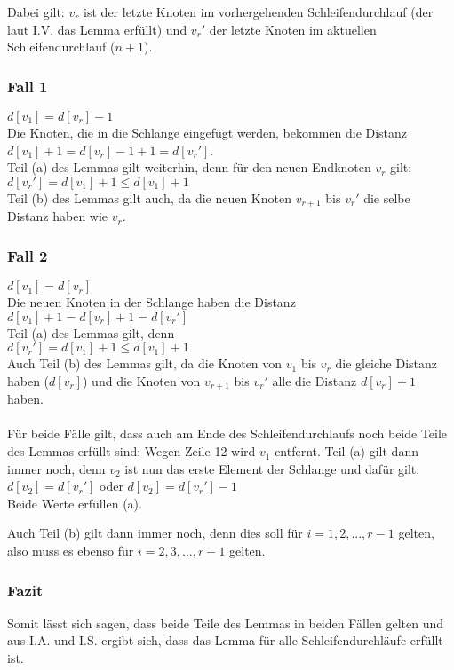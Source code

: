 \documentclass[11pt, oneside]{article}   	%
\begin{document}
Dabei gilt: $v_r$ ist der letzte Knoten im vorhergehenden Schleifendurchlauf (der laut I.V. das Lemma erfüllt) und $v_r'$ der letzte Knoten im aktuellen Schleifendurchlauf ($n+1$).
\subsubsection*{Fall 1} $d[v_1] = d[v_r] - 1$\\
Die Knoten, die in die Schlange eingefügt werden, bekommen die Distanz\\
$d[v_1] + 1 = d[v_r] - 1 + 1 = d[v_r'] $.\\
Teil (a) des Lemmas gilt weiterhin, denn für den neuen Endknoten $v_r$ gilt: \\
$ d[v_r'] = d[v_1] + 1 \le d[v_1] + 1 $ \\
Teil (b) des Lemmas gilt auch, da die neuen Knoten $v_{r+1}$ bis $v_r'$ die selbe Distanz haben wie $v_r$.

\subsubsection*{Fall 2} $d[v_1] = d[v_r]$\\
Die neuen Knoten in der Schlange haben die Distanz \\
$d[v_1] + 1 = d[v_r] + 1 = d[v_r']$ \\

Teil (a) des Lemmas gilt, denn\\
$ d[v_r'] = d[v_1] + 1 \le d[v_1] + 1$\\
Auch Teil (b) des Lemmas gilt, da die Knoten von $v_1$ bis $v_r$ die gleiche Distanz haben ($d[v_r]$) und die Knoten von $v_{r+1}$ bis $v_r'$ alle die Distanz $d[v_r] + 1$ haben.\\
 \\

Für beide Fälle gilt, dass auch am Ende des Schleifendurchlaufs noch beide Teile des Lemmas erfüllt sind:
Wegen Zeile 12 wird $v_1$ entfernt.
Teil (a) gilt dann immer noch, denn $v_2$ ist nun das erste Element der Schlange und dafür gilt: \\
$d[v_2] = d[v_r']$ oder $d[v_2] = d[v_r'] - 1$\\
Beide Werte erfüllen (a).

Auch Teil (b) gilt dann immer noch, denn dies soll für $ i = 1, 2, ..., r -1$ gelten, also muss es ebenso für $ i = 2, 3, ..., r-1$ gelten.


\subsubsection*{Fazit} Somit lässt sich sagen, dass beide Teile des Lemmas in beiden Fällen gelten und aus I.A. und I.S. ergibt sich, dass das Lemma für alle Schleifendurchläufe erfüllt ist.
\end{document}
